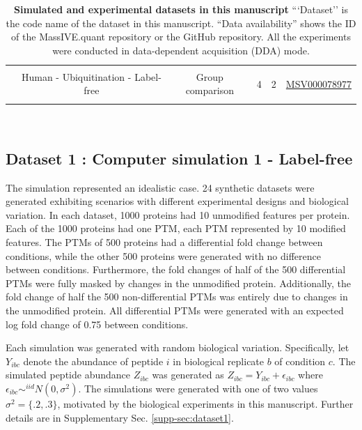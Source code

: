 \documentclass[mcp]{article}
\numberwithin{table}{section}
\begin{document}
\begin{table}[h!]
\begin{tiny}
\begin{tabular}{|c|c|ccc|c|}
&&&&& \\%
& Human - Ubiquitination - Label-free & Group comparison & 4 & 2 & \href{https://massive.ucsd.edu/ProteoSAFe/dataset.jsp?task=1b516164de5345108b40b75147dd58b5}{MSV000078977}\\ [0.02in]
 &&&&& \\
 \hline
\end{tabular}\\
\end{tiny}
\caption{ \small {\bf Simulated and experimental datasets in this manuscript} 
```Dataset'' is the code name of the dataset in this manuscript.
``Data availability'' shows the ID of the MassIVE.quant repository or the GitHub repository. All the experiments were conducted in data-dependent acquisition (DDA) mode.
}
\label{tab:dataDescription}
\end{table}

\subsection*{Dataset 1 : Computer simulation 1 - Label-free}
\label{sec:comp_sim_procedure1}

The simulation represented an idealistic case. 24 synthetic datasets were generated exhibiting scenarios with different experimental designs and biological variation. In each dataset, 1000 proteins had 10 unmodified features per protein. Each of the 1000 proteins had one PTM, each PTM represented by 10 modified features. The PTMs of 500 proteins had a differential fold change between conditions, while the other 500 proteins were generated with no difference between conditions. Furthermore, the fold changes of half of the 500 differential PTMs were fully masked by changes in the unmodified protein. Additionally, the fold change of half the 500 non-differential PTMs was entirely due to changes in the unmodified protein. All differential PTMs were generated with an expected log fold change of 0.75 between conditions. 

Each simulation was generated with random biological variation. Specifically, let $Y_{ibc}$ denote the abundance of peptide $i$ in biological replicate $b$ of condition $c$. The simulated peptide abundance  $Z_{ibc}$ was generated as $Z_{ibc} = Y_{ibc} + \epsilon_{ibc}$ where $\epsilon_{ibc}\sim^{iid}N(0,\sigma^2)$. The simulations were generated with one of two values $\sigma^2 = \{.2, .3\}$, motivated by the biological experiments in this manuscript.
Further details are in Supplementary Sec. \ref{supp-sec:dataset1}.
\end{document}
